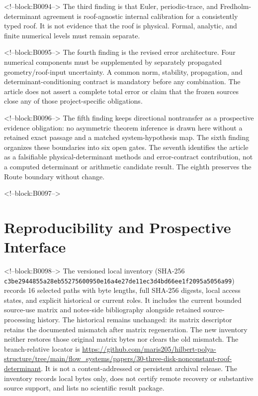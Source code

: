 \documentclass[11pt,a4paper]{article}
\begin{document}
<!--block:B0094-->
The third finding is that Euler, periodic-trace, and Fredholm-determinant agreement is roof-agnostic internal calibration for a consistently typed roof. It is not evidence that the roof is physical. Formal, analytic, and finite numerical levels must remain separate.

<!--block:B0095-->
The fourth finding is the revised error architecture. Four numerical components must be supplemented by separately propagated geometry/roof-input uncertainty. A common norm, stability, propagation, and determinant-conditioning contract is mandatory before any combination. The article does not assert a complete total error or claim that the frozen sources close any of those project-specific obligations.

<!--block:B0096-->
The fifth finding keeps directional nontransfer as a prospective evidence obligation: no asymmetric theorem inference is drawn here without a retained exact passage and a matched system-hypothesis map. The sixth finding organizes these boundaries into six open gates. The seventh identifies the article as a falsifiable physical-determinant methods and error-contract contribution, not a computed determinant or arithmetic candidate result. The eighth preserves the Route boundary without change.

<!--block:B0097-->
\section{Reproducibility and Prospective Interface}

<!--block:B0098-->
The versioned local inventory
 (SHA-256
\texttt{c3be2944855a28eb\allowbreak 55275600950e16a4\allowbreak e27de11ec3d4bd66\allowbreak ee1f2095a5056a99}) records 16 selected paths with byte lengths, full SHA-256 digests,
local access states, and explicit historical or current roles. It includes the
current bounded source-use matrix and notes-side bibliography alongside retained
source-processing history. The historical
 remains unchanged:
its  matrix descriptor retains the documented mismatch after
matrix regeneration. The new inventory neither restores those original matrix
bytes nor clears the old mismatch. The branch-relative locator is
\url{https://github.com/maris205/hilbert-polya-structure/tree/main/flow_systems/papers/30-three-disk-nonconstant-roof-determinant}.
It is not a content-addressed or persistent archival release. The inventory
records local bytes only, does not certify remote recovery or substantive source
support, and lists no scientific result package.
\end{document}
